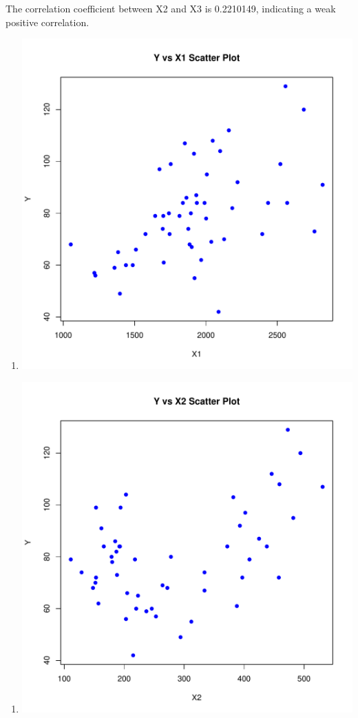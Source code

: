 \documentclass[12pt,letterpaper]{article}
\begin{document}
\begin{itemize}
		The correlation coefficient between X2 and X3 is 0.2210149, indicating a weak positive correlation.\\
		
		  
		
		\begin{enumerate}
			\item[]
			\includegraphics[width=.85\textwidth]{plot.Y.X1_YuFan.pdf}
		\end{enumerate}   
		
		  
		\begin{enumerate}
			\item[]
			\includegraphics[width=.85\textwidth]{plot.Y.X2_YuFan.pdf}
		\end{enumerate}   
		

\end{itemize}
\end{document}
